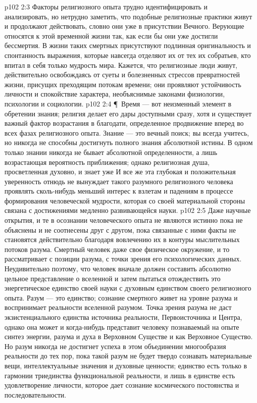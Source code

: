 \vs p102 2:3 Факторы религиозного опыта трудно идентифицировать и анализировать, но нетрудно заметить, что подобные религиозные практики живут и продолжают действовать, словно они уже в присутствии Вечного. Верующие относятся к этой временной жизни так, как если бы они уже достигли бессмертия. В жизни таких смертных присутствуют подлинная оригинальность и спонтанность выражения, которые навсегда отделяют их от тех их собратьев, кто впитал в себя только мудрость мира. Кажется, что религиозные люди живут, действительно освобождаясь от суеты и болезненных стрессов превратностей жизни, присущих преходящим потокам времени; они проявляют устойчивость личности и спокойствие характера, необъяснимые законами физиологии, психологии и социологии.
\vs p102 2:4 \P\ Время --- вот неизменный элемент в обретении знания; религия делает его дары доступными сразу, хотя и существует важный фактор возрастания в благодати, определенное продвижение вперед во всех фазах религиозного опыта. Знание --- это вечный поиск; вы всегда учитесь, но никогда не способны достигнуть полного знания абсолютной истины. В одном только знании никогда не бывает абсолютной определенности, а лишь возрастающая вероятность приближения; однако религиозная душа, просветленная духовно,  и знает уже  И все же эта глубокая и положительная уверенность отнюдь не вынуждает такого разумного религиозного человека проявлять сколь\hyp{}нибудь меньший интерес к взлетам и падениям в процессе формирования человеческой мудрости, которая со своей материальной стороны связана с достижениями медленно развивающейся науки.
\vs p102 2:5 Даже научные открытия, и те в осознании человеческого опыта не являются истинно  пока не объяснены и не соотнесены друг с другом, пока связанные с ними факты не становятся действительно  благодаря вовлечению их в контуры мыслительных потоков разума. Смертный человек даже свое физическое окружение, и то рассматривает с позиции разума, с точки зрения его психологических данных. Неудивительно поэтому, что человек вначале должен составить абсолютно цельное представление о вселенной и затем пытаться отождествить это энергетическое единство своей науки с духовным единством своего религиозного опыта. Разум --- это единство; сознание смертного живет на уровне разума и воспринимает реальности вселенной разумом. Точка зрения разума не даст экзистенциального единства источника реальности, Первоисточника и Центра, однако она может и когда\hyp{}нибудь представит человеку познаваемый на опыте синтез энергии, разума и духа в Верховном Существе и как Верховное Существо. Но разум никогда не достигнет успеха в этом объединении многообразия реальности до тех пор, пока такой разум не будет твердо сознавать материальные вещи, интеллектуальные значения и духовные ценности; единство есть только в гармонии триединства функциональной реальности, и лишь в единстве есть удовлетворение личности, которое дает сознание космического постоянства и последовательности.
